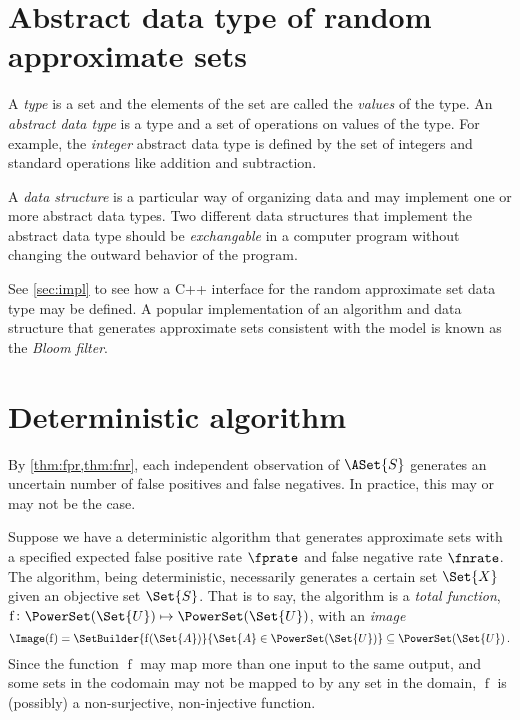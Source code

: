 \documentclass[ ../main.tex]{subfiles}
\begin{document}
\section{Abstract data type of random approximate sets}
\label{sec:adt}
A \emph{type} is a set and the elements of the set are called the \emph{values} of the type. An \emph{abstract data type} is a type and a set of operations on values of the type.
For example, the \emph{integer} abstract data type is defined by the set of integers and standard operations like addition and subtraction.

A \emph{data structure} is a particular way of organizing data and may implement one or more abstract data types.
Two different data structures that implement the abstract data type should be \emph{exchangable} in a computer program without changing the outward behavior of the program.

See \cref{sec:impl} to see how a C++ interface for the random approximate set data type may be defined.
A popular implementation of an algorithm and data structure that generates approximate sets consistent with the model is known as the \emph{Bloom filter}.

\section{Deterministic algorithm}
By \cref{thm:fpr,thm:fnr}, each independent observation of $\ASet{S}$ generates an uncertain number of false positives and false negatives.
In practice, this may or may not be the case.

Suppose we have a deterministic algorithm that generates approximate sets with a specified expected false positive rate $\fprate$ and false negative rate $\fnrate$.
The algorithm, being deterministic, necessarily generates a certain set $\Set{X}$ given an objective set $\Set{S}$. That is to say, the algorithm is a \emph{total function},
	$\operatorname{f} \colon \PowerSet(\Set{U}) \mapsto \PowerSet(\Set{U})$,
with an \emph{image}
\begin{equation}
\Image(\operatorname{f}) = 
    \SetBuilder{\operatorname{f}(\Set{A})}{\Set{A} \in \PowerSet(\Set{U})}
        \subseteq \PowerSet(\Set{U})\,.
\end{equation}
Since the function $\operatorname{f}$ may map more than one input to the same output, and some sets in the codomain may not be mapped to by any set in the domain, $\operatorname{f}$ is (possibly) a non-surjective, non-injective function.
\end{document}
